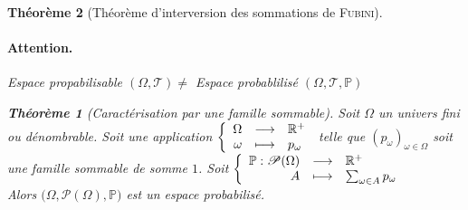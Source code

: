 \documentclass[11pt,a4paper]{report}
\newtheorem{theorem}{Théorème}[chapter]
\newtheorem{itheorem}[theorem]{Théorème}
\theoremstyle{definition}
\begin{document}
\begin{theorem}[Théorème d'interversion des sommations de \textsc{Fubini}]
{{\paragraph{Attention.} Espace propabilisable $(\Omega, \mathscr{T}) \neq$ Espace probablilisé $(\Omega, \mathscr{T},\mathbb{P})$\\[\baselineskip]
\begin{itheorem}[Caractérisation par une famille sommable]\label{thm:proba_famille_sommable}
     Soit $\Omega$ un univers fini ou dénombrable. \newline
     Soit une application $\left\lbrace \begin{array}{r c l} \Omega &\longrightarrow& \ensuremath{\mathbb{R}}^+ \\ \omega &\longmapsto& p_\omega \end{array}\right.$ telle que $(p_\omega)_{\omega\in\Omega}$ soit une \emph{famille sommable} de somme $1$.\newline
     Soit $\left\lbrace \begin{array}{r c l} \mathbb{P} : \mathscr{P}(\Omega)&\longrightarrow& \ensuremath{\mathbb{R}}^+ \\ A &\longmapsto& \sum_{\omega \in A} p_\omega \end{array}\right.$\\
     Alors $\big( \Omega, \mathscr{P}(\Omega ), \mathbb{P}\big)$ est un espace probabilisé.
\end{itheorem}

}}
\end{theorem}
\end{document}
